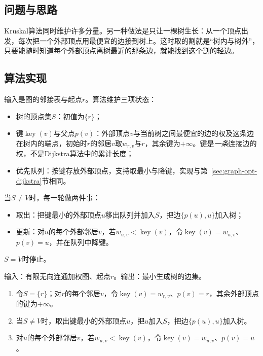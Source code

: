 \subsection{问题与思路}

Kruskal算法同时维护许多分量。另一种做法是只让一棵树生长：从一个顶点出发，每次把一个外部顶点用最便宜的边接到树上。这时取的割就是“树内与树外”，只要能随时知道每个外部顶点离树最近的那条边，就能找到这个割的轻边。

\subsection{算法实现}

输入是图的邻接表与起点$r$。算法维护三项状态：
\begin{itemize}
  \item 树的顶点集$S$：初值为$\{r\}$；
  \item 键$\operatorname{key}(v)$与父点$p(v)$：外部顶点$v$与当前树之间最便宜的边的权及这条边在树内的端点，初始时$r$的邻居$v$取$w_{r,v}$与$r$，其余键为$+\infty$。键是\emph{一条}连接边的权，不是Dijkstra算法中的累计长度；
  \item 优先队列：按键存放外部顶点，支持取最小与降键，实现与第~\ref{sec:graph-opt-dijkstra}节相同。
\end{itemize}
当$S\neq V$时，每一轮做两件事：
\begin{itemize}
  \item 取出：把键最小的外部顶点$u$移出队列并加入$S$，把边$\{p(u),u\}$加入树；
  \item 更新：对$u$的每个外部邻居$v$，若$w_{u,v}<\operatorname{key}(v)$，令$\operatorname{key}(v)=w_{u,v}$、$p(v)=u$，并在队列中降键。
\end{itemize}
$S=V$时停止。

\begin{algorithm}[Prim算法]
\label{alg:graph-opt-prim}
输入：有限无向连通加权图、起点$r$。输出：最小生成树的边集。
\begin{enumerate}
  \item 令$S=\{r\}$；对$r$的每个邻居$v$，令$\operatorname{key}(v)=w_{r,v}$、$p(v)=r$，其余外部顶点的键为$+\infty$。
  \item 当$S\neq V$时，取出键最小的外部顶点$u$，把$u$加入$S$，把边$\{p(u),u\}$加入树。
  \item 对$u$的每个外部邻居$v$，若$w_{u,v}<\operatorname{key}(v)$，令$\operatorname{key}(v)=w_{u,v}$、$p(v)=u$。
\end{enumerate}
\end{algorithm}

